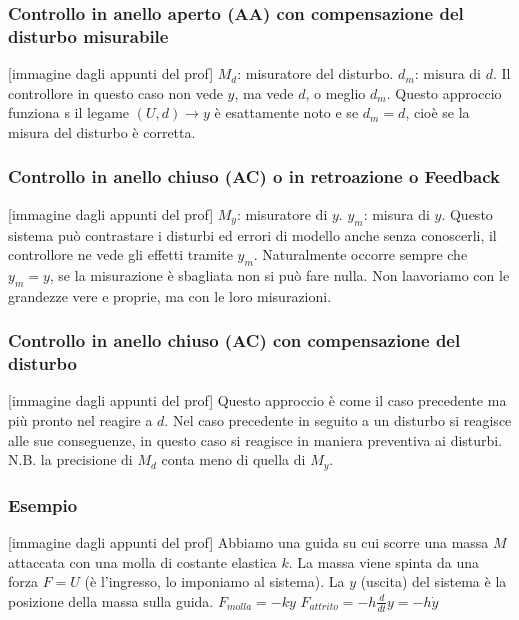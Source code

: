 \subsubsection{Controllo in anello aperto (AA) con compensazione del disturbo misurabile}
[immagine dagli appunti del prof]\newline
$M_d$: misuratore del disturbo.\newline
$d_m$: misura di $d$.\newline
Il controllore in questo caso non vede $y$, ma vede $d$, o meglio $d_m$.\newline
Questo approccio funziona s il legame $(U,d) \rightarrow y$ è esattamente noto e se $d_m = d$, cioè se la misura del disturbo è corretta.
\subsubsection{Controllo in anello chiuso (AC) o in retroazione o Feedback}
[immagine dagli appunti del prof]\newline
$M_y$: misuratore di $y$.\newline
$y_m$: misura di $y$.\newline
Questo sistema può contrastare i disturbi ed errori di modello anche senza conoscerli, il controllore ne vede gli effetti tramite $y_m$.\newline
Naturalmente occorre sempre che $y_m = y$, se la misurazione è sbagliata non si può fare nulla. Non laavoriamo con le grandezze vere e proprie, ma con le loro misurazioni.
\subsubsection{Controllo in anello chiuso (AC) con compensazione del disturbo}
[immagine dagli appunti del prof]\newline
Questo approccio è come il caso precedente ma più pronto nel reagire a $d$. Nel caso precedente in seguito a un disturbo si reagisce alle sue conseguenze, in questo caso si reagisce in maniera preventiva ai disturbi.\newline
N.B. la precisione di $M_d$ conta meno di quella di $M_y$.
\subsubsection{Esempio}
[immagine dagli appunti del prof]\newline
Abbiamo una guida su cui scorre una massa $M$ attaccata con una molla di costante elastica $k$. La massa viene spinta da una forza $F = U$ (è l'ingresso, lo imponiamo al sistema). La $y$ (uscita) del sistema è la posizione della massa sulla guida.\newline
$F_{molla} = -ky$\newline
$F_{attrito} = - h \frac{d}{dt}y = -h \dot{y}$
